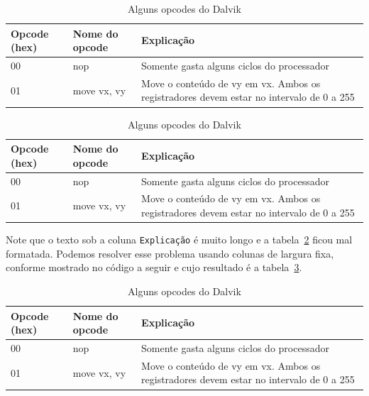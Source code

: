 \documentclass[12pt,a4paper,twoside]{report}
\begin{document}
\begin{latex}
\begin{table}[h]
  \centering
  \caption{Alguns opcodes do Dalvik \label{tab:opcode1}}
  \begin{tabular}{lll} \hline
  {\bf Opcode (hex)} & {\bf Nome do opcode} & {\bf Explicação} \\ \hline
  00 & nop & Somente gasta alguns ciclos do processador \\ \hline
  01 & move vx, vy & Move o conteúdo de vy em vx. Ambos os registradores
   devem estar no intervalo de 0 a 255 \\\hline
  \end{tabular}
\end{table}
\end{latex}

\begin{table}[h]
  \centering
  \caption{Alguns opcodes do Dalvik \label{tab:opcode1}}
  \begin{tabular}{lll} \hline
  {\bf Opcode (hex)} & {\bf Nome do opcode} & {\bf Explicação} \\ \hline
  00 & nop & Somente gasta alguns ciclos do processador \\ \hline
  01 & move vx, vy & Move o conteúdo de vy em vx. Ambos os registradores
   devem estar no intervalo de 0 a 255 \\\hline
  \end{tabular}
\end{table}

Note que o texto sob a coluna \texttt{Explicação} é muito longo e a
tabela~\ref{tab:opcode1} ficou mal formatada. Podemos resolver esse problema
usando colunas de largura fixa, conforme mostrado no código a seguir e cujo
resultado é a tabela~\ref{tab:opcode2}.

\begin{latex}
\begin{table}[h]
  \centering
  \caption{Alguns opcodes do Dalvik \label{tab:opcode2}}
  \begin{tabular}{p{1.5cm}lp{9cm}} \hline
  {\bf Opcode (hex)} & {\bf Nome do opcode} & {\bf Explicação} \\ \hline
  00 & nop & Somente gasta alguns ciclos do processador \\ \hline
  01 & move vx, vy & Move o conteúdo de vy em vx. Ambos os registradores
   devem estar no intervalo de 0 a 255 \\\hline
  \end{tabular}
\end{table}
\end{latex}
\end{document}
